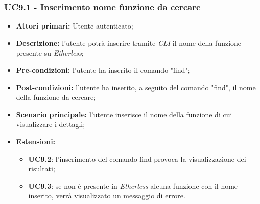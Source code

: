 \subsubsection{UC9.1 - Inserimento nome funzione da cercare}
\begin{itemize}
	\item \textbf{Attori primari:} Utente autenticato;
	\item \textbf{Descrizione:} l'utente potrà inserire tramite \textit{CLI\glo} il nome della funzione presente su \textit{Etherless};
	\item \textbf{Pre-condizioni:} l'utente ha inserito il comando "find";
	\item \textbf{Post-condizioni:} l'utente ha inserito, a seguito del comando "find", il nome della funzione da cercare;
	\item \textbf{Scenario principale:} l'utente inserisce il nome della funzione di cui visualizzare i dettagli;
	\item \textbf{Estensioni:}
	\begin{itemize}
		\item \textbf{UC9.2}: l'inserimento del comando find provoca la visualizzazione dei risultati;
		\item \textbf{UC9.3}: se non è presente in \textit{Etherless} alcuna funzione con il nome inserito, verrà visualizzato un messaggio di errore.
	\end{itemize}
\end{itemize}
